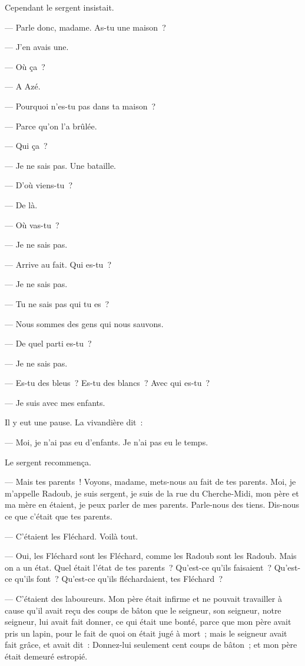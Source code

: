 \documentclass[french,twoside]{book} %
\begin{document}
 Cependant le sergent insistait.\par
— Parle donc, madame. As-tu une maison ?\par
— J’en avais une.\par
— Où ça ?\par
— A Azé.\par
— Pourquoi n’es-tu pas dans ta maison ?\par
— Parce qu’on l’a brûlée.\par
— Qui ça ?\par
— Je ne sais pas. Une bataille.\par
— D’où viens-tu ?\par
— De là.\par
— Où vas-tu ?\par
— Je ne sais pas.\par
— Arrive au fait. Qui es-tu ?\par
— Je ne sais pas.\par
— Tu ne sais pas qui tu es ?\par
— Nous sommes des gens qui nous sauvons.\par
— De quel parti es-tu ?\par
— Je ne sais pas.\par
— Es-tu des bleus ? Es-tu des blancs ? Avec qui es-tu ?\par
— Je suis avec mes enfants.\par
Il y eut une pause. La vivandière dit :\par
— Moi, je n’ai pas eu d’enfants. Je n’ai pas eu le temps.\par
Le sergent recommença.\par
— Mais tes parents ! Voyons, madame, mets-nous au fait de tes parents. Moi, je m’appelle Radoub, je suis sergent, je suis de la rue du Cherche-Midi, mon père et ma mère en étaient, je peux parler de mes  parents. Parle-nous des tiens. Dis-nous ce que c’était que tes parents.\par
— C’étaient les Fléchard. Voilà tout.\par
— Oui, les Fléchard sont les Fléchard, comme les Radoub sont les Radoub. Mais on a un état. Quel était l’état de tes parents ? Qu’est-ce qu’ils faisaient ? Qu’est-ce qu’ils font ? Qu’est-ce qu’ils fléchardaient, tes Fléchard ?\par
— C’étaient des laboureurs. Mon père était infirme et ne pouvait travailler à cause qu’il avait reçu des coups de bâton que le seigneur, son seigneur, notre seigneur, lui avait fait donner, ce qui était une bonté, parce que mon père avait pris un lapin, pour le fait de quoi on était jugé à mort ; mais le seigneur avait fait grâce, et avait dit : Donnez-lui seulement cent coups de bâton ; et mon père était demeuré estropié.\par
\end{document}
